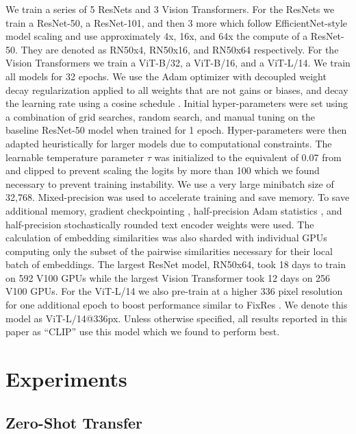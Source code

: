 \documentclass{article}
\begin{document}
We train a series of 5 ResNets and 3 Vision Transformers. For the ResNets we train a ResNet-50, a ResNet-101, and then 3 more which follow EfficientNet-style model scaling and use approximately 4x, 16x, and 64x the compute of a ResNet-50. They are denoted as RN50x4, RN50x16, and RN50x64 respectively. For the Vision Transformers we train a ViT-B/32, a ViT-B/16, and a ViT-L/14. We train all models for 32 epochs. We use the Adam optimizer \citep{kingma2014adam} with decoupled weight decay regularization \citep{loshchilov2017decoupled} applied to all weights that are not gains or biases, and decay the learning rate using a cosine schedule \citep{loshchilov2016sgdr}. Initial hyper-parameters were set using a combination of grid searches, random search, and manual tuning on the baseline ResNet-50 model when trained for 1 epoch. Hyper-parameters were then adapted heuristically for larger models due to computational constraints. The learnable temperature parameter $\tau$ was initialized to the equivalent of 0.07 from \citep{wu2018unsupervised} and clipped to prevent scaling the logits by more than 100 which we found necessary to prevent training instability. We use a very large minibatch size of 32,768. Mixed-precision \citep{micikevicius2017mixed} was used to accelerate training and save memory. To save additional memory, gradient checkpointing \citep{griewank2000algorithm,chen2016training}, half-precision Adam statistics \citep{dhariwal2020jukebox}, and half-precision stochastically rounded text encoder weights were used. The calculation of embedding similarities was also sharded with individual GPUs computing only the subset of the pairwise similarities necessary for their local batch of embeddings. The largest ResNet model, RN50x64, took 18 days to train on 592 V100 GPUs while the largest Vision Transformer took 12 days on 256 V100 GPUs. For the ViT-L/14 we also pre-train at a higher 336 pixel resolution for one additional epoch to boost performance similar to FixRes \citep{touvron2019fixing}. We denote this model as ViT-L/14@336px. Unless otherwise specified, all results reported in this paper as ``CLIP'' use this model which we found to perform best.







\section{Experiments}

\subsection{Zero-Shot Transfer}
\label{subsection:zero_shot_transfer}
\end{document}
